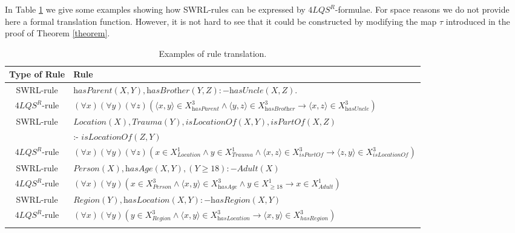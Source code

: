 \documentclass[a4paper]{llncs}
\newcommand{\flqsr}{\ensuremath{4LQS^R}}
\begin{document}
 In Table \ref{SWRL} we give some examples showing how SWRL-rules can be expressed by \flqsr-formulae. For space reasons we do not provide here a formal translation function. However, it is not hard to see that
it could be constructed by modifying the map $\tau$ introduced in the proof of Theorem \ref{theorem}.
\newcommand{\hasParent}{\textit{hasParent}}
\newcommand{\hasBrother}{\textit{hasBrother}}
\newcommand{\hasUncle}{\textit{hasUncle}}
\newcommand{\Location}{\textit{Location}}
\newcommand{\Trauma}{\textit{Trauma}}
\newcommand{\isLocationOf}{\textit{isLocationOf}}
\newcommand{\isPartOf}{\textit{isPartOf}}
\newcommand{\Person}{\textit{Person}}
\newcommand{\hasAge}{\textit{hasAge}}
\newcommand{\Adult}{\textit{Adult}}
\newcommand{\hasLocation}{\textit{hasLocation}}
\newcommand{\hasRegion}{\textit{hasRegion}}
\newcommand{\Region}{\textit{Region}}
{\small
\begin{longtable}{|c|>{\centering\arraybackslash}m{10cm}|}
\hline
Type of Rule & Rule\\
\hline
SWRL-rule & $ \hasParent(X, Y) , \hasBrother(Y, Z) :- \hasUncle(X, Z).$  \\
\flqsr-rule & $(\forall x)(\forall y)(\forall z)( \langle x,y \rangle \in X^3_{\hasParent} \wedge \langle y,z \rangle \in X^3_{\hasBrother} \rightarrow \langle x,z \rangle \in X^3_{\hasUncle})$\\
\hline
SWRL-rule & $\Location(X),\Trauma(Y),\isLocationOf(X, Y),\isPartOf(X,Z)$  \\
       & :- $\isLocationOf(Z, Y)$ \\
\flqsr-rule & $(\forall x)(\forall y)(\forall z)( x \in X^1_{\Location} \wedge y \in X^1_{\Trauma} \wedge \langle x,z \rangle \in X^3_{\isPartOf} \rightarrow \langle z,y \rangle \in X^3_{\isLocationOf})$\\
\hline
SWRL-rule & $ \Person(X), \hasAge(X, Y), (Y \geq 18) :- \Adult(X)$  \\
\flqsr-rule & $(\forall x)(\forall y)( x \in X^3_{\Person} \wedge \langle x,y \rangle \in X^3_{\hasAge} \wedge y \in X^1_{\geq 18} \rightarrow x \in X^1_{\Adult} )$\\
\hline
SWRL-rule & $ Region(Y), \hasLocation(X, Y) :- \hasRegion(X,Y)$  \\
\flqsr-rule & $(\forall x)(\forall y)( y \in X^3_{\Region} \wedge \langle x,y \rangle \in X^3_{\hasLocation}\rightarrow  \langle x,y \rangle \in X^3_{hasRegion} )$\\
\hline
\caption{ Examples of rule translation.}\label{SWRL}
\end{longtable}}
\end{document}
